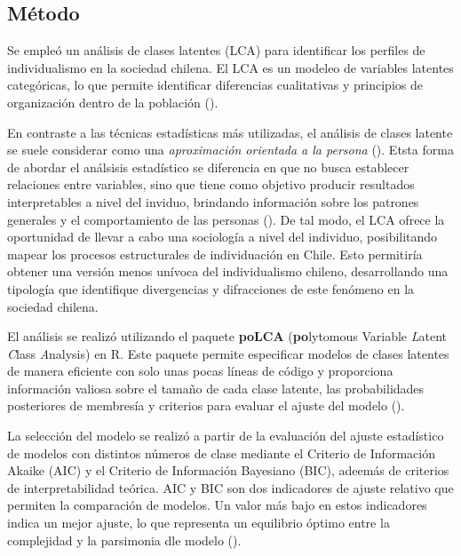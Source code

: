 \documentclass[
  12pt,
  letterpaper,
  DIV=11,
  numbers=noendperiod]{scrartcl}
\begin{document}
\endgroup{}

\subsection{Método}\label{muxe9todo}

Se empleó un análisis de clases latentes (LCA) para identificar los
perfiles de individualismo en la sociedad chilena. El LCA es un modeleo
de variables latentes categóricas, lo que permite identificar
diferencias cualitativas y principios de organización dentro de la
población ().

En contraste a las técnicas estadísticas más utilizadas, el análisis de
clases latente se suele considerar como una \emph{aproximación orientada
a la persona} ().
Etsta forma de abordar el análsisis estadístico se diferencia en que no
busca establecer relaciones entre variables, sino que tiene como
objetivo producir resultados interpretables a nivel del inviduo,
brindando información sobre los patrones generales y el comportamiento
de las personas (). De
tal modo, el LCA ofrece la oportunidad de llevar a cabo una sociología a
nivel del individuo, posibilitando mapear los procesos estructurales de
individuación en Chile. Esto permitiría obtener una versión menos
unívoca del individualismo chileno, desarrollando una tipología que
identifique divergencias y difracciones de este fenómeno en la sociedad
chilena.

El análisis se realizó utilizando el paquete \textbf{poLCA}
(\textbf{po}lytomous Variable \emph{L}atent \emph{C}lass
\emph{A}nalysis) en R. Este paquete permite especificar modelos de
clases latentes de manera eficiente con solo unas pocas líneas de código
y proporciona información valiosa sobre el tamaño de cada clase latente,
las probabilidades posteriores de membresía y criterios para evaluar el
ajuste del modelo ().

La selección del modelo se realizó a partir de la evaluación del ajuste
estadístico de modelos con distintos números de clase mediante el
Criterio de Información Akaike (AIC) y el Criterio de Información
Bayesiano (BIC), adeemás de criterios de interpretabilidad teórica. AIC
y BIC son dos indicadores de ajuste relativo que permiten la comparación
de modelos. Un valor más bajo en estos indicadores indica un mejor
ajuste, lo que representa un equilibrio óptimo entre la complejidad y la
parsimonia dle modelo ().
\end{document}
